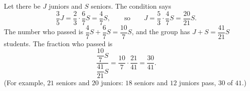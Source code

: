 Let there be $J$ juniors and $S$ seniors. The condition says
\[
\dfrac{3}{5}J=\dfrac{2}{3}\cdot\dfrac{6}{7}S=\dfrac{4}{7}S,\qquad\text{so}\qquad J=\dfrac{5}{3}\cdot\dfrac{4}{7}S=\dfrac{20}{21}S .
\]
The number who passed is $\dfrac{4}{7}S+\dfrac{6}{7}S=\dfrac{10}{7}S$, and the group has $J+S=\dfrac{41}{21}S$ students. The fraction who passed is
\[
\dfrac{\dfrac{10}{7}S}{\dfrac{41}{21}S}=\dfrac{10}{7}\cdot\dfrac{21}{41}=\boxed{\dfrac{30}{41}}.
\]
(For example, $21$ seniors and $20$ juniors: $18$ seniors and $12$ juniors pass, $30$ of $41$.)
